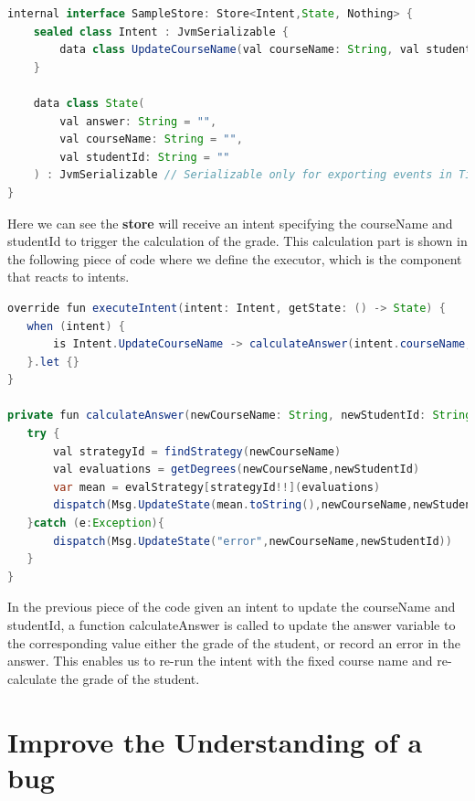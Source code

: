 
\begin{lstlisting}[language=java]
internal interface SampleStore: Store<Intent,State, Nothing> {
    sealed class Intent : JvmSerializable {
        data class UpdateCourseName(val courseName: String, val studentId: String) : Intent()
    }

    data class State(
        val answer: String = "",
        val courseName: String = "",
        val studentId: String = ""
    ) : JvmSerializable // Serializable only for exporting events in Time Travel, no need otherwise.
}
\end{lstlisting}

Here we can see the \textbf{store} will receive an intent specifying the courseName and studentId to trigger the calculation of the grade. This calculation part is shown in the following piece of code where we define the executor, which is the component that reacts to intents.

\begin{lstlisting}[language=java]
override fun executeIntent(intent: Intent, getState: () -> State) {
   when (intent) {
       is Intent.UpdateCourseName -> calculateAnswer(intent.courseName, intent.studentId)
   }.let {}
}

private fun calculateAnswer(newCourseName: String, newStudentId: String) {
   try {
       val strategyId = findStrategy(newCourseName)
       val evaluations = getDegrees(newCourseName,newStudentId)
       var mean = evalStrategy[strategyId!!](evaluations)
       dispatch(Msg.UpdateState(mean.toString(),newCourseName,newStudentId))
   }catch (e:Exception){
       dispatch(Msg.UpdateState("error",newCourseName,newStudentId))
   }
}

\end{lstlisting}

In the previous piece of the code given an intent to update the courseName and studentId, a function calculateAnswer is called to update the answer variable to the corresponding value either the grade of the student, or record an error in the answer. This enables us to re-run the intent with the fixed course name and re-calculate the grade of the student.

\section{Improve the Understanding of a bug}

